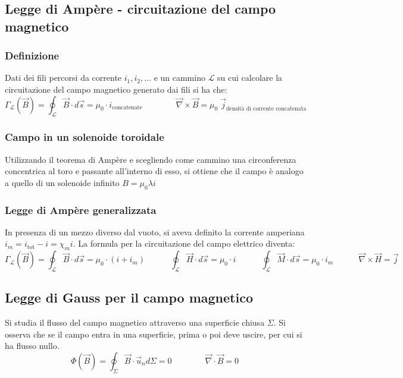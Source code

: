 \documentclass[a4paper]{article}
\newcommand\un{\vec{u}_n}
\newcommand\nab{\vec{\nabla}} %
\begin{document}
\subsection{Legge di Ampère - circuitazione del campo magnetico}
\subsubsection*{Definizione}
Dati dei fili percorsi da corrente \(i_1, i_2, \dots\) e un cammino \(\mathcal{L}\) su cui calcolare la circuitazione del campo
magnetico generato dai fili si ha che:
\[\Gamma_\mathcal{L} (\vec{B}) = \oint_\mathcal{L} \vec{B} \cdot d\vec{s} = \mu_0 \cdot i_\text{concatenate} \qquad \qquad \nab \times \vec{B} = \mu_0 \; \vec{j}_\text{densità di corrente concatenata}\]

\subsubsection*{Campo in un solenoide toroidale}
Utilizzando il teorema di Ampère e scegliendo come cammino una circonferenza concentrica al toro e passante all'interno di esso,
si ottiene che il campo è analogo a quello di un solenoide infinito \(B = \mu_0 \lambda i\)

\subsubsection*{Legge di Ampère generalizzata}
In presenza di un mezzo diverso dal vuoto, si aveva definito la corrente amperiana \(i_m = i_\text{tot} - i = \chi_m i\). La
formula per la circuitazione del campo elettrico diventa:
\[\Gamma_\mathcal{L} (\vec{B}) = \oint_\mathcal{L} \vec{B} \cdot d\vec{s} = \mu_0 \cdot (i + i_m) \qquad\quad \oint_\mathcal{L} \vec{H} \cdot d\vec{s} = \mu_0 \cdot i \qquad\quad \oint_\mathcal{L} \vec{M} \cdot d\vec{s} = \mu_0 \cdot i_m \qquad\quad \nab \times \vec{H} = \vec{j}\]

\subsection{Legge di Gauss per il campo magnetico}
Si studia il flusso del campo magnetico attraverso una superficie chiusa \(\Sigma\). Si osserva che se il campo
entra in una superficie, prima o poi deve uscire, per cui si ha flusso nullo.
\[\Phi(\vec{B}) = \oint_\Sigma \vec{B} \cdot \un d\Sigma = 0 \qquad \qquad \nab \cdot \vec{B} = 0\]

\newpage
\end{document}
